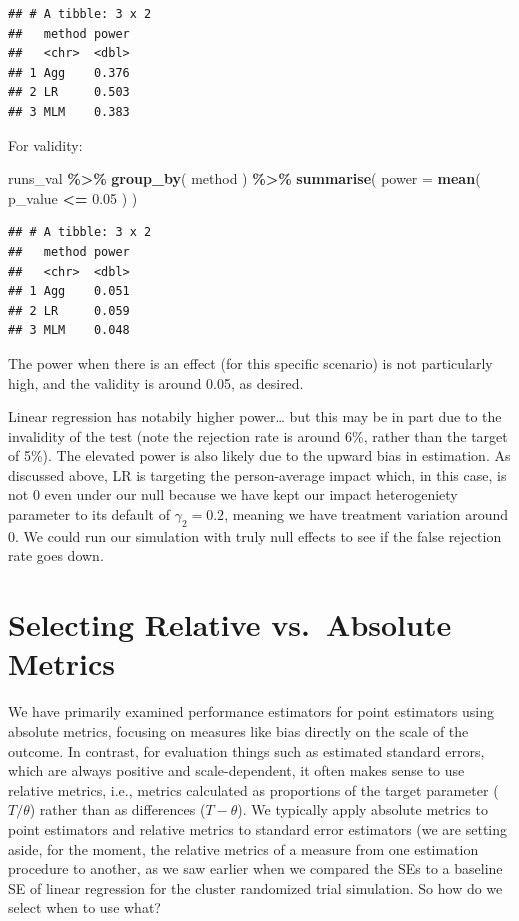 \documentclass[
]{book}
\newenvironment{Shaded}{\begin{snugshade}}{\end{snugshade}}
\newcommand{\AttributeTok}[1]{\textcolor[rgb]{0.13,0.29,0.53}{#1}}
\newcommand{\FloatTok}[1]{\textcolor[rgb]{0.00,0.00,0.81}{#1}}
\newcommand{\FunctionTok}[1]{\textcolor[rgb]{0.13,0.29,0.53}{\textbf{#1}}}
\newcommand{\NormalTok}[1]{#1}
\newcommand{\SpecialCharTok}[1]{\textcolor[rgb]{0.81,0.36,0.00}{\textbf{#1}}}
\begin{document}
\begin{verbatim}
## # A tibble: 3 x 2
##   method power
##   <chr>  <dbl>
## 1 Agg    0.376
## 2 LR     0.503
## 3 MLM    0.383
\end{verbatim}

For validity:

\begin{Shaded}
\begin{Highlighting}[]
\NormalTok{runs\_val }\SpecialCharTok{\%\textgreater{}\%} \FunctionTok{group\_by}\NormalTok{( method ) }\SpecialCharTok{\%\textgreater{}\%}
  \FunctionTok{summarise}\NormalTok{( }\AttributeTok{power =} \FunctionTok{mean}\NormalTok{( p\_value }\SpecialCharTok{\textless{}=} \FloatTok{0.05}\NormalTok{ ) )}
\end{Highlighting}
\end{Shaded}

\begin{verbatim}
## # A tibble: 3 x 2
##   method power
##   <chr>  <dbl>
## 1 Agg    0.051
## 2 LR     0.059
## 3 MLM    0.048
\end{verbatim}

The power when there is an effect (for this specific scenario) is not particularly high, and the validity is around 0.05, as desired.

Linear regression has notabily higher power\ldots{} but this may be in part due to the invalidity of the test (note the rejection rate is around 6\%, rather than the target of 5\%).
The elevated power is also likely due to the upward bias in estimation.
As discussed above, LR is targeting the person-average impact which, in this case, is not 0 even under our null because we have kept our impact heterogeniety parameter to its default of \(\gamma_2=0.2\), meaning we have treatment variation around 0.
We could run our simulation with truly null effects to see if the false rejection rate goes down.

\section{Selecting Relative vs.~Absolute Metrics}\label{sec-relative-performance}

We have primarily examined performance estimators for point estimators using absolute metrics, focusing on measures like bias directly on the scale of the outcome.
In contrast, for evaluation things such as estimated standard errors, which are always positive and scale-dependent, it often makes sense to use relative metrics, i.e., metrics calculated as proportions of the target parameter (\(T/\theta\)) rather than as differences (\(T - \theta\)).
We typically apply absolute metrics to point estimators and relative metrics to standard error estimators (we are setting aside, for the moment, the relative metrics of a measure from one estimation procedure to another, as we saw earlier when we compared the SEs to a baseline SE of linear regression for the cluster randomized trial simulation.
So how do we select when to use what?
\end{document}
